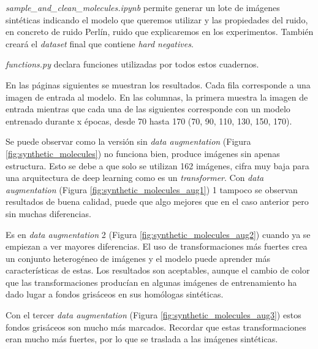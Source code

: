 \noindent \textit{sample\_and\_clean\_molecules.ipynb}  permite generar un lote de imágenes sintéticas indicando el modelo que queremos utilizar y las propiedades del ruido, en concreto de ruido Perlín, ruido que explicaremos en los experimentos. También creará el \textit{dataset} final que contiene \textit{hard negatives}.

\noindent \textit{functions.py} declara funciones utilizadas por todos estos cuadernos.

\newpage
En las páginas siguientes se muestran los resultados. Cada fila corresponde a una imagen de entrada al modelo. En las columnas, la primera muestra la imagen de entrada mientras que cada una de las siguientes corresponde con un modelo entrenado durante x épocas, desde 70 hasta 170 (70, 90, 110, 130, 150, 170).

Se puede observar como la versión sin \textit{data augmentation} (Figura \ref{fig:synthetic_molecules}) no funciona bien, produce imágenes sin apenas estructura. Esto se debe a que solo se utilizan 162 imágenes, cifra muy baja para una arquitectura de deep learning como es un \textit{transformer}. Con \textit{data augmentation} (Figura \ref{fig:synthetic_molecules_aug1}) 1 tampoco se observan resultados de buena calidad, puede que algo mejores que en el caso anterior pero sin muchas diferencias.

Es en \textit{data augmentation} 2 (Figura \ref{fig:synthetic_molecules_aug2}) cuando ya se empiezan a ver mayores diferencias. El uso de transformaciones más fuertes crea un conjunto heterogéneo de imágenes y el modelo puede aprender más características de estas. Los resultados son aceptables, aunque el cambio de color que las transformaciones producían en algunas imágenes de entrenamiento ha dado lugar a fondos grisáceos en sus homólogas sintéticas. 

Con el tercer \textit{data augmentation} (Figura \ref{fig:synthetic_molecules_aug3}) estos fondos grisáceos son mucho más marcados. Recordar que estas transformaciones eran mucho más fuertes, por lo que se traslada a las imágenes sintéticas.


